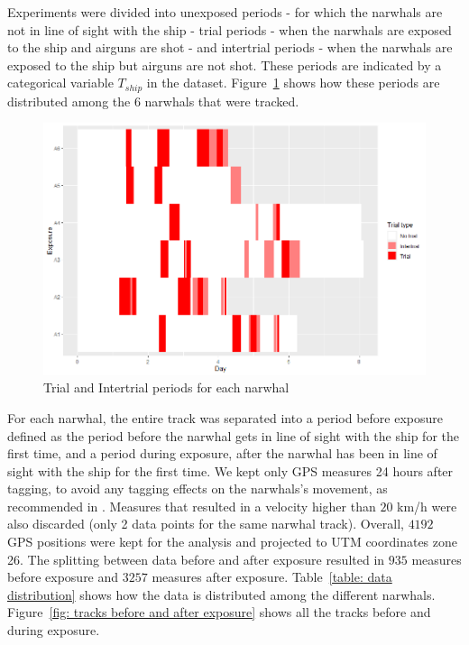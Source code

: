 \documentclass[11pt]{article}
\newcommand {\1}{\mathbb{1}}
\begin{document}
Experiments were divided into unexposed periods - for which the narwhals are not in line of sight with the ship - trial periods - when the narwhals are exposed to the ship and airguns are shot - and intertrial periods - when the narwhals are exposed to the ship but airguns are not shot. These periods are indicated by a categorical variable $T_{ship}$ in the dataset. Figure~\ref{fig: trials and intertrials distributions} shows how these periods are distributed among the $6$ narwhals that were tracked.

\begin{figure}[H]
    \centering
    \includegraphics[scale=0.4]{images/data_exploration/trials.png}
    \caption{Trial and Intertrial periods for each narwhal}
    \label{fig: trials and intertrials distributions}
\end{figure}

For each narwhal, the entire track was separated into a period before exposure defined as the period before the narwhal gets in line of sight with the ship for the first time, and a period during exposure, after the narwhal has been in line of sight with the ship for the first time. We kept only GPS measures 24 
hours after tagging, to avoid any tagging effects on the narwhals's movement, as recommended in \cite{heide-jorgensen_behavioral_2021}.
Measures that resulted in a velocity higher than $20$ km/h were also discarded (only 2 data points for the same narwhal track).
Overall, $4192$ GPS positions were kept for the analysis and projected to UTM coordinates zone 26. The splitting between data before and after exposure resulted in $935$ measures before exposure and $3257$ measures after exposure. Table~\ref{table: data distribution} shows how the data is distributed among the different narwhals. Figure~\ref{fig: tracks before and after exposure} shows all the tracks before and during exposure.
\end{document}
